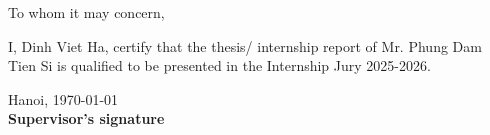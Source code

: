 \thispagestyle{empty}

\begin{center}
	To whom it may concern,
\end{center}

\vspace{0.5cm}

\noindent
I, Dinh Viet Ha, certify that the thesis/ internship report of Mr. Phung Dam Tien Si is qualified to be presented in the Internship Jury 2025-2026.

\vspace{3cm}

\begin{flushright}
	Hanoi, \today \\[0.5cm]
	\textbf{Supervisor's signature}
\end{flushright}